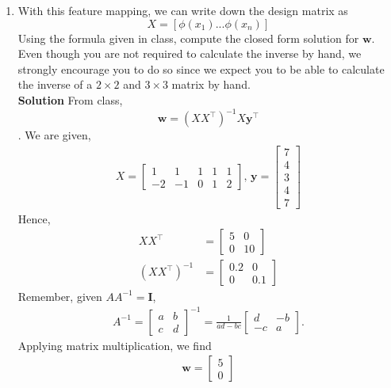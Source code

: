 \documentclass[11pt]{article}
\begin{document}
		\begin{enumerate}
			\item With this feature mapping, we can write down the design matrix as
			$$X = [\phi(x_1) ... \phi(x_n)]$$
			Using the formula given in class, compute the closed form solution for $\mathbf{w}$. Even though you are not required to calculate the inverse by hand, we strongly encourage you to do so since we expect you to be able to calculate the inverse of a $2 \times 2$ and $3 \times 3$ matrix by hand.
			\newline \\
			\textbf{Solution} From class, $$\mathbf{w}=(XX^\top)^{-1}X\mathbf{y}^\top$$.
			We are given,
			\begin{align*}
			X = \begin{bmatrix}
			1 & 1 & 1 &1 & 1           \\[0.3em]
			-2 & -1 & 0 &1 &2
			\end{bmatrix},\,
			\mathbf{y} = \begin{bmatrix}
			7 \\[0.3em]
			4 \\
			3 \\
			4 \\
			7
			\end{bmatrix}
			\end{align*}
			Hence,
			\begin{align*}
			XX^\top & = \begin{bmatrix}
			5 & 0          \\[0.3em]
			0 & 10
			\end{bmatrix} \\
			(XX^\top)^{-1} & = \begin{bmatrix}
			0.2 & 0          \\[0.3em]
			0 & 0.1
			\end{bmatrix}
			\end{align*}
			Remember, given $AA^{-1}=\mathbf{I}$,
			\begin{align*}
			A^{-1} = \begin{bmatrix}
			a & b           \\[0.3em]
			c & d
			\end{bmatrix}^{-1} =
			\frac{1}{ad-bc}\begin{bmatrix}
			d & -b           \\[0.3em]
			-c & a
			\end{bmatrix}.
			\end{align*}
			Applying matrix multiplication, we find
			\begin{align*}
			\mathbf{w} = \begin{bmatrix}
			5           \\[0.3em]
			0
			\end{bmatrix}
			\end{align*}
			

\end{enumerate}
\end{document}
